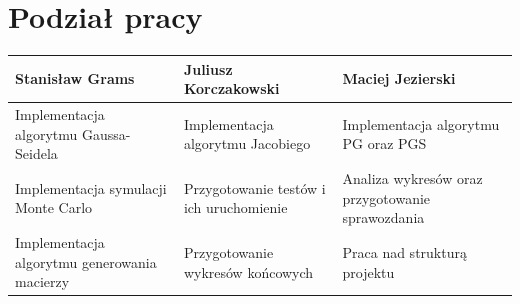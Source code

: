 \documentclass[10pt]{article}
\begin{document}
\section{Podział pracy}
\centering
	\begin{tabular}{| p{5cm} | p{5cm} | p{5cm} |}
		\hline
		\textbf{Stanisław Grams} & \textbf{Juliusz Korczakowski} & \textbf{Maciej Jezierski} \\ \hline
		Implementacja algorytmu Gaussa-Seidela & Implementacja algorytmu Jacobiego & Implementacja algorytmu PG oraz PGS  \\ \hline
		 Implementacja symulacji Monte Carlo& Przygotowanie testów i ich uruchomienie &Analiza wykresów oraz przygotowanie sprawozdania \\ \hline
		Implementacja algorytmu generowania macierzy & Przygotowanie wykresów końcowych &Praca nad strukturą projektu\\ \hline
	\end{tabular}
\end{document}
